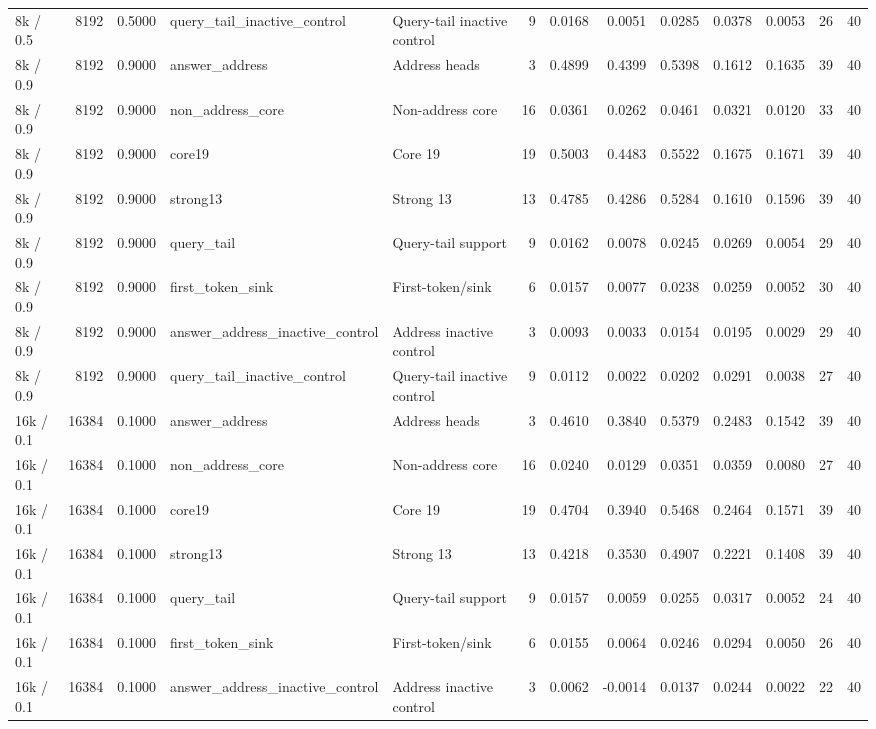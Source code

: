 \begin{tabular}{lrrllrrrrrrrr}
8k / 0.5 & 8192 & 0.5000 & query_tail_inactive_control & Query-tail inactive control & 9 & 0.0168 & 0.0051 & 0.0285 & 0.0378 & 0.0053 & 26 & 40 \\
8k / 0.9 & 8192 & 0.9000 & answer_address & Address heads & 3 & 0.4899 & 0.4399 & 0.5398 & 0.1612 & 0.1635 & 39 & 40 \\
8k / 0.9 & 8192 & 0.9000 & non_address_core & Non-address core & 16 & 0.0361 & 0.0262 & 0.0461 & 0.0321 & 0.0120 & 33 & 40 \\
8k / 0.9 & 8192 & 0.9000 & core19 & Core 19 & 19 & 0.5003 & 0.4483 & 0.5522 & 0.1675 & 0.1671 & 39 & 40 \\
8k / 0.9 & 8192 & 0.9000 & strong13 & Strong 13 & 13 & 0.4785 & 0.4286 & 0.5284 & 0.1610 & 0.1596 & 39 & 40 \\
8k / 0.9 & 8192 & 0.9000 & query_tail & Query-tail support & 9 & 0.0162 & 0.0078 & 0.0245 & 0.0269 & 0.0054 & 29 & 40 \\
8k / 0.9 & 8192 & 0.9000 & first_token_sink & First-token/sink & 6 & 0.0157 & 0.0077 & 0.0238 & 0.0259 & 0.0052 & 30 & 40 \\
8k / 0.9 & 8192 & 0.9000 & answer_address_inactive_control & Address inactive control & 3 & 0.0093 & 0.0033 & 0.0154 & 0.0195 & 0.0029 & 29 & 40 \\
8k / 0.9 & 8192 & 0.9000 & query_tail_inactive_control & Query-tail inactive control & 9 & 0.0112 & 0.0022 & 0.0202 & 0.0291 & 0.0038 & 27 & 40 \\
16k / 0.1 & 16384 & 0.1000 & answer_address & Address heads & 3 & 0.4610 & 0.3840 & 0.5379 & 0.2483 & 0.1542 & 39 & 40 \\
16k / 0.1 & 16384 & 0.1000 & non_address_core & Non-address core & 16 & 0.0240 & 0.0129 & 0.0351 & 0.0359 & 0.0080 & 27 & 40 \\
16k / 0.1 & 16384 & 0.1000 & core19 & Core 19 & 19 & 0.4704 & 0.3940 & 0.5468 & 0.2464 & 0.1571 & 39 & 40 \\
16k / 0.1 & 16384 & 0.1000 & strong13 & Strong 13 & 13 & 0.4218 & 0.3530 & 0.4907 & 0.2221 & 0.1408 & 39 & 40 \\
16k / 0.1 & 16384 & 0.1000 & query_tail & Query-tail support & 9 & 0.0157 & 0.0059 & 0.0255 & 0.0317 & 0.0052 & 24 & 40 \\
16k / 0.1 & 16384 & 0.1000 & first_token_sink & First-token/sink & 6 & 0.0155 & 0.0064 & 0.0246 & 0.0294 & 0.0050 & 26 & 40 \\
16k / 0.1 & 16384 & 0.1000 & answer_address_inactive_control & Address inactive control & 3 & 0.0062 & -0.0014 & 0.0137 & 0.0244 & 0.0022 & 22 & 40 \\

\end{tabular}
